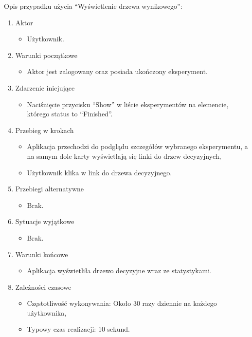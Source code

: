 Opis przypadku użycia \enquote{Wyświetlenie drzewa wynikowego}:
\begin{enumerate}
	\item  Aktor
	\begin{itemize}
		\item Użytkownik. 
	\end{itemize}
	\item Warunki początkowe
	\begin{itemize}
		\item Aktor jest zalogowany oraz posiada ukończony eksperyment.
	\end{itemize}
	\item Zdarzenie inicjujące
	\begin{itemize}
		\item Naciśnięcie przycisku \enquote{Show} w liście eksperymentów na elemencie, którego status to \enquote{Finished}.
	\end{itemize}
	\item Przebieg w krokach
	\begin{itemize}
		\item Aplikacja przechodzi do podglądu szczegółów wybranego eksperymentu, a na samym dole karty wyświetlają się linki do drzew decyzyjnych,
		\item Użytkownik klika w link do drzewa decyzyjnego.
	\end{itemize}
	\item Przebiegi alternatywne
	\begin{itemize}
		\item  Brak.
	\end{itemize}
	\item Sytuacje wyjątkowe
	\begin{itemize}
		\item  Brak.
	\end{itemize}
	\item Warunki końcowe
	\begin{itemize}
	\item  Aplikacja wyświetliła drzewo decyzyjne wraz ze statystykami.
	\end{itemize}
	\item Zależności czasowe
	\begin{itemize}
		\item Częstotliwość wykonywania: Około 30 razy dziennie na każdego użytkownika,
		\item Typowy czas realizacji: 10 sekund.
	\end{itemize}
\end{enumerate}

